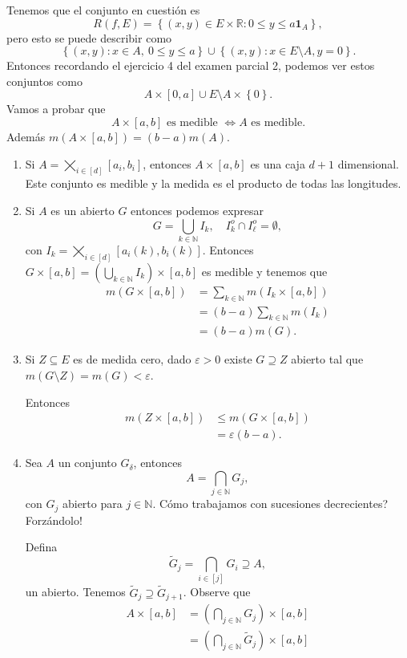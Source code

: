 \documentclass[12pt]{article}
\theoremstyle{plain}
\theoremstyle{definition}
\theoremstyle{remark}
\numberwithin{equation}{section}
\newcommand{\bN}{\mathbb{N}}        %
\newcommand{\bR}{\mathbb{R}}        %
\newcommand{\ind}{\mathbf{1}}       %
\renewcommand{\leq}{\leqslant}      %
\renewcommand{\:}{\colon}           %
\newcommand{\conj}[1]{\left\lbrace#1\right\rbrace}
\newcommand{\bonj}[1]{\left\lbrack#1\right\rbrack}
\begin{document}
\begin{multicols}{2}
\begin{ptcbp}
Tenemos que el conjunto en cuestión es
$$R(f,E)=\conj{(x,y)\in E\times\bR\: 0\leq y\leq a\ind_A},$$
pero esto se puede describir como
$$\conj{(x,y)\: x\in A,\ 0\leq y\leq a}\cup\conj{(x,y)\: x\in E\setminus A, y=0}.$$
Entonces recordando el ejercicio 4 del examen parcial 2, podemos ver estos conjuntos como
$$A\times\bonj{0,a}\cup E\setminus A\times\conj{0}.$$
Vamos a probar que
$$A\times\bonj{a,b}\text{ es medible }\iff A\text{ es medible}.$$
Además $m(A\times\bonj{a,b})=(b-a)m(A)$.\par
\begin{enumerate}
  \item Si $A=\bigtimes_{i\in\bonj{d}}\bonj{a_i,b_i}$, entonces $A\times\bonj{a,b}$ es una caja $d+1$ dimensional. Este conjunto es medible y la medida es el producto de todas las longitudes.
  \item Si $A$ es un abierto $G$ entonces podemos expresar
  $$G=\bigcup_{k\in\bN}I_k,\quad I_k^o\cap I_\ell^o=\emptyset,$$
  con $I_k=\bigtimes_{i\in\bonj{d}}\bonj{a_i(k),b_i(k)}$. Entonces
  $G\times\bonj{a,b}=\left(\bigcup_{k\in\bN}I_k\right)\times\bonj{a,b}$ es medible y tenemos que
  \begin{align*}
    m(G\times\bonj{a,b}) &=\sum_{k\in\bN}m(I_k\times\bonj{a,b})\\
    &=(b-a)\sum_{k\in\bN}m(I_k)\\
    &=(b-a)m(G).
  \end{align*}
  \item Si $Z\subseteq E$ es de medida cero, dado $\varepsilon>0$ existe $G\supseteq Z$ abierto tal que $m(G\setminus Z)=m(G)<\varepsilon$.\par
      Entonces
      \begin{align*}
        m(Z\times\bonj{a,b}) &\leq m(G\times\bonj{a,b})\\
        &=\varepsilon(b-a).
      \end{align*}
  \item Sea $A$ un conjunto $G_\delta$, entonces $$A=\bigcap_{j\in\bN}G_j,$$ con $G_j$ abierto para $j\in\bN$. Cómo trabajamos con sucesiones decrecientes? Forzándolo!\par
      Defina $$\tilde{G}_j=\bigcap_{i\in\bonj{j}}G_i\supseteq A,$$
      un abierto. Tenemos $\tilde{G}_j\supseteq\tilde{G}_{j+1}$. Observe que
      \begin{align*}
        A\times\bonj{a,b} &=\left(\bigcap_{j\in\bN}G_j\right)\times\bonj{a,b}\\
        &= \left(\bigcap_{j\in\bN}\tilde{G}_j\right)\times\bonj{a,b}\\

\end{align*}
\end{enumerate}
\end{ptcbp}
\end{multicols}
\end{document}
